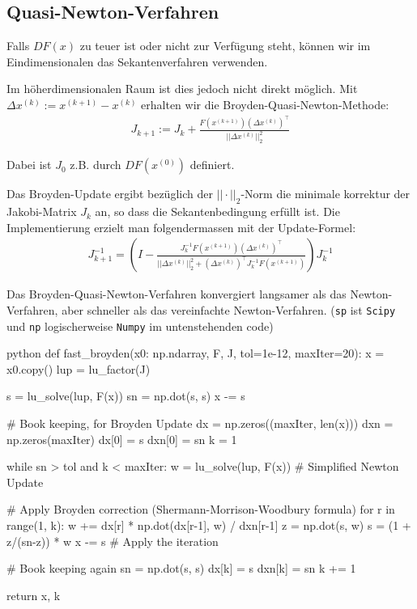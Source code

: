 \newsectionNoPB
\subsection{Quasi-Newton-Verfahren}
Falls $DF(x)$ zu teuer ist oder nicht zur Verfügung steht, können wir im Eindimensionalen das Sekantenverfahren verwenden.

Im höherdimensionalen Raum ist dies jedoch nicht direkt möglich. Mit $\Delta x^{(k)} := x^{(k + 1)} - x^{(k)}$ erhalten wir die Broyden-Quasi-Newton-Methode:
\rmvspace
\begin{align*}
    J_{k + 1} := J_k + \frac{F(x^{(k + 1)}) (\Delta x^{(k)})^\top}{||\Delta x^{(k)}||_2^2}
\end{align*}

\drmvspace
Dabei ist $J_0$ z.B. durch $DF(x^{(0)})$ definiert.

 Das Broyden-Update ergibt bezüglich der $||\cdot||_2$-Norm die minimale korrektur der Jakobi-Matrix $J_k$ an, so dass die Sekantenbedingung erfüllt ist.
Die Implementierung erzielt man folgendermassen mit der  Update-Formel:
\begin{align*}
    J_{k + 1}^{-1} = \left( I - \frac{J_k^{-1} F(x^{(k + 1)}) (\Delta x^{(k)})^\top}{||\Delta x^{(k)}||_2^2 + (\Delta x^{(k)})^\top J_k^{-1} F(x^{(k + 1)})} \right) J^{-1}_k
\end{align*}

Das Broyden-Quasi-Newton-Verfahren konvergiert langsamer als das Newton-Verfahren, aber schneller als das vereinfachte Newton-Verfahren. (\texttt{sp} ist \texttt{Scipy} und \texttt{np} logischerweise \texttt{Numpy} im untenstehenden code)

\begin{code}{python}
def fast_broyden(x0: np.ndarray, F, J, tol=1e-12, maxIter=20):
    x   = x0.copy()
    lup = lu_factor(J)
    
    s  = lu_solve(lup, F(x))
    sn = np.dot(s, s)
    x -= s
    
    # Book keeping, for Broyden Update
    dx     = np.zeros((maxIter, len(x)))
    dxn    = np.zeros(maxIter)
    dx[0]  = s
    dxn[0] = sn
    k = 1
    
    while sn > tol and k < maxIter:
        w = lu_solve(lup, F(x))     # Simplified Newton Update
        
        # Apply Broyden correction (Shermann-Morrison-Woodbury formula)
        for r in range(1, k):
            w += dx[r] * np.dot(dx[r-1], w) / dxn[r-1]
        z = np.dot(s, w)
        s = (1 + z/(sn-z)) * w
        x -= s      # Apply the iteration
        
        # Book keeping again
        sn = np.dot(s, s)
        dx[k] = s
        dxn[k] = sn
        k += 1
    
    return x, k
\end{code}

